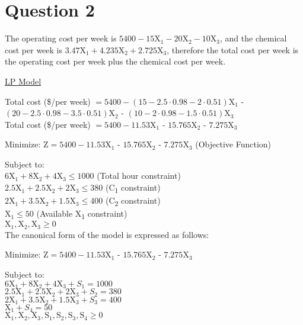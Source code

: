 \section*{Question 2}

The operating cost per week is $5400 - 15$X$_1 - 20$X$_2 - 10$X$_3$, and the chemical cost per week is $3.47$X$_1 + 4.235$X$_2 + 2.725$X$_3$, therefore the total cost per week is the operating cost per week plus the chemical cost per week.

\underline{LP Model}

Total cost (\$/per week) $ = 5400 - (15 - 2.5\cdot0.98 - 2\cdot0.51)$X$_1$ - $(20 - 2.5\cdot0.98 - 3.5\cdot0.51)$X$_2$ - $(10 - 2\cdot0.98 - 1.5\cdot0.51)$X$_3$ \\
Total cost (\$/per week) $ = 5400 - 11.53$X$_1$ - $15.765$X$_2$ - $7.275$X$_3$

Minimize: Z$ = 5400 - 11.53$X$_1$ - $15.765$X$_2$ - $7.275$X$_3$ (Objective Function)

Subject to:\\
$6\text{X}_1 + 8\text{X}_2 + 4\text{X}_3 \leq 1000$ (Total hour constraint) \\
$2.5\text{X}_1 + 2.5\text{X}_2 + 2\text{X}_3 \leq 380$ (C\textsubscript{1} constraint) \\
$2\text{X}_1 + 3.5\text{X}_2 + 1.5\text{X}_3 \leq 400 $ (C\textsubscript{2} constraint) \\
$\text{X}_1 \leq 50$ (Available X\textsubscript{1} constraint) \\
$\text{X}_1, \text{X}_2, \text{X}_3 \geq 0$ \\


The canonical form of the model is expressed as follows:

Minimize: Z$ = 5400 - 11.53$X$_1$ - $15.765$X$_2$ - $7.275$X$_3$

Subject to:\\
$6\text{X}_1 + 8\text{X}_2 + 4\text{X}_3 + S_1 = 1000$ \\
$2.5\text{X}_1 + 2.5\text{X}_2 + 2\text{X}_3 + S_2 = 380$ \\
$2\text{X}_1 + 3.5\text{X}_2 + 1.5\text{X}_3 + S_3 = 400 $ \\
$\text{X}_1 + S_4 = 50$ \\
$\text{X}_1, \text{X}_2, \text{X}_3, \text{S}_1, \text{S}_2, \text{S}_3, \text{S}_4 \geq 0$ \\

